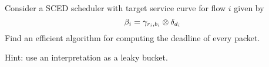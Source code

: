 \begin{problem}
Consider a SCED scheduler with target service curve for flow $i$
given by
$$\beta_i= \gamma_{r_i, b_i}\otimes \delta_{d_i}
$$
Find an efficient algorithm for computing the deadline of every
packet.

Hint: use an interpretation as a leaky bucket. 
\end{problem}
